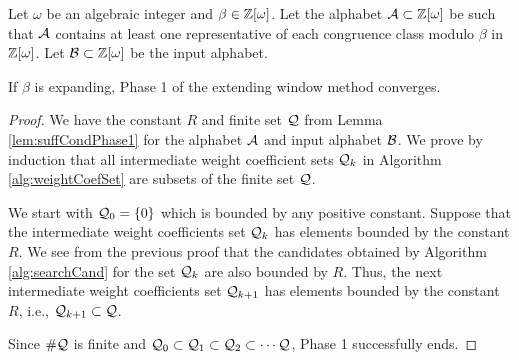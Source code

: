 \begin{theo}
\label{thm:suffCondPhase1}
Let $\omega$ be an algebraic integer and $\beta\in\mathbb{Z}[\omega]$. Let the alphabet $\mathcal{A}\subset\mathbb{Z}[\omega]$ be such that $\mathcal{A}$ contains at least one representative of each congruence class modulo $\beta$ in $\mathbb{Z}[\omega]$. Let $\mathcal{B}\subset\mathbb{Z}[\omega]$ be the input alphabet. 

If $\beta$ is expanding, Phase 1 of the extending window method converges.
\end{theo}
\begin{proof}
We have the constant $R$ and finite set $\mathcal{Q}$ from Lemma \ref{lem:suffCondPhase1} for the alphabet $\mathcal{A}$ and input alphabet $\mathcal{B}$. We prove by induction that  all intermediate weight coefficient sets $\mathcal{Q}_k$ in Algorithm \ref{alg:weightCoefSet} are subsets of the finite set $\mathcal{Q}$. 

We start with $\mathcal{Q}_0=\{0\}$ which is bounded by any positive constant. Suppose that the intermediate weight coefficients set $\mathcal{Q}_k$ has elements bounded by the constant $R$. We see from the previous  proof that the candidates obtained by Algorithm \ref{alg:searchCand} for the set $\mathcal{Q}_k$ are also bounded by $R$. Thus, the next intermediate weight coefficients set $\mathcal{Q}_{k+1}$ has elements bounded by the constant $R$, i.e., $\mathcal{Q}_{k+1}\subset\mathcal{Q}$. 

Since $\#\mathcal{Q}$ is finite and $\mathcal{Q}_0\subset\mathcal{Q}_1\subset\mathcal{Q}_2\subset\cdots\mathcal{Q}$,  Phase 1 successfully ends. 
\end{proof}


